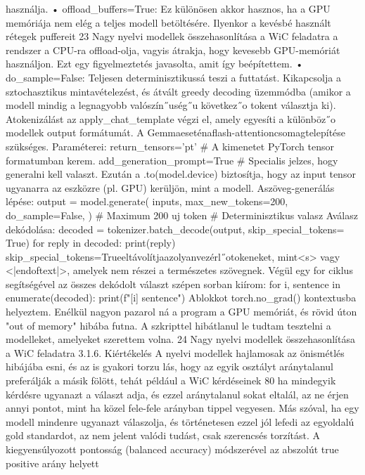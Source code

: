 \documentclass[12pt]{report}
\theoremstyle{definition}
\begin{document}
 használja.
 • offload_buffers=True: Ez különösen akkor hasznos, ha a GPU memóriája
 nem elég a teljes modell betöltésére. Ilyenkor a kevésbé használt rétegek puffereit
 23
Nagy nyelvi modellek összehasonlítása a WiC feladatra
 a rendszer a CPU-ra offload-olja, vagyis átrakja, hogy kevesebb GPU-memóriát
 használjon. Ezt egy figyelmeztetés javasolta, amit így beépítettem.
 • do_sample=False: Teljesen determinisztikussá teszi a futtatást. Kikapcsolja
 a sztochasztikus mintavételezést, és átvált greedy decoding üzemmódba (amikor a
 modell mindig a legnagyobb valószín˝uség˝u következ˝o tokent választja ki).
 Atokenizálást az apply_chat_template végzi el, amely egyesíti a különböz˝o
 modellek output formátumát. A Gemmaeseténaflash-attentioncsomagtelepítése
 szükséges. Paraméterei:
 return_tensors=’pt’
 # A kimenetet PyTorch tensor
 formatumban kerem.
 add_generation_prompt=True # Specialis jelzes, hogy generalni
 kell valaszt.
 Ezután a .to(model.device) biztosítja, hogy az input tensor ugyanarra az
 eszközre (pl. GPU) kerüljön, mint a modell.
 Aszöveg-generálás lépése:
 output = model.generate(
 inputs,
 max_new_tokens=200,
 do_sample=False,
 )
 # Maximum 200 uj token
 # Determinisztikus valasz
 Aválasz dekódolása:
 decoded = tokenizer.batch_decode(output, skip_special_tokens=
 True)
 for reply in decoded:
 print(reply)
 skip_special_tokens=Trueeltávolítjaazolyanvezérl˝otokeneket, mint<s>
 vagy <|endoftext|>, amelyek nem részei a természetes szövegnek.
 Végül egy for ciklus segítségével az összes dekódolt választ szépen sorban kiírom:
 for i, sentence in enumerate(decoded):
 print(f"[{i}] {sentence}")
 Ablokkot torch.no_grad() kontextusba helyeztem. Enélkül nagyon pazarol
ná a program a GPU memóriát, és rövid úton "out of memory" hibába futna. A szkripttel
 hibátlanul le tudtam tesztelni a modelleket, amelyeket szerettem volna.
 24
Nagy nyelvi modellek összehasonlítása a WiC feladatra
 3.1.6. Kiértékelés
 A nyelvi modellek hajlamosak az önismétlés hibájába esni, és az is gyakori torzu
lás, hogy az egyik osztályt aránytalanul preferálják a másik fölött, tehát például a WiC
 kérdéseinek 80%
 ha mindegyik kérdésre ugyanazt a választ adja, és ezzel aránytalanul sokat eltalál, az ne
 érjen annyi pontot, mint ha közel fele-fele arányban tippel vegyesen. Más szóval, ha egy
 modell mindenre ugyanazt válaszolja, és történetesen ezzel jól lefedi az egyoldalú gold
 standardot, az nem jelent valódi tudást, csak szerencsés torzítást. A kiegyensúlyozott
 pontosság (balanced accuracy) módszerével az abszolút true positive arány helyett
\end{document}
